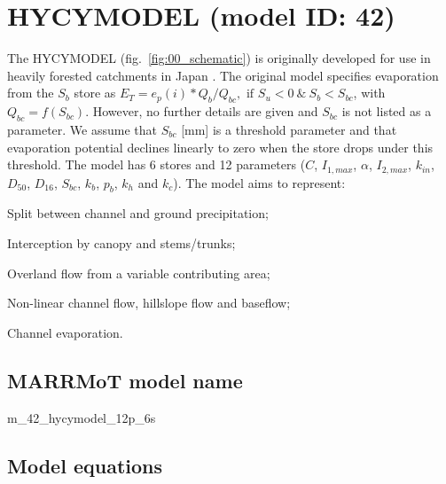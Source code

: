 \section{HYCYMODEL (model ID: 42)}
The HYCYMODEL (fig.~\ref{fig:00_schematic}) is originally developed for use in heavily forested catchments in Japan \citep{Fukushima1988}. The original model specifies evaporation from the $S_b$ store as $E_T = e_p(i)*Q_b/Q_{bc}, \text{ if } S_u < 0 ~\&~ S_b < S_{bc}$, with $Q_{bc} = f(S_{bc})$. However, no further details are given and $S_{bc}$ is not listed as a parameter. We assume that $S_{bc}$ [mm] is a threshold  parameter and that evaporation potential declines linearly to zero when the store drops under this threshold. The model has 6 stores and 12 parameters ($C$, $I_{1,max}$, $\alpha$, $I_{2,max}$, $k_{in}$, $D_{50}$, $D_{16}$, $S_{bc}$, $k_b$, $p_b$, $k_h$ and $k_c$). The model aims to represent:

\begin{itemizecompact}
\item Split between channel and ground precipitation;
\item Interception by canopy and stems/trunks;
\item Overland flow from a variable contributing area;
\item Non-linear channel flow, hillslope flow and baseflow;
\item Channel evaporation.
\end{itemizecompact}

\subsection{MARRMoT model name}
m\_42\_hycymodel\_12p\_6s \\

\subsection{Model equations}

